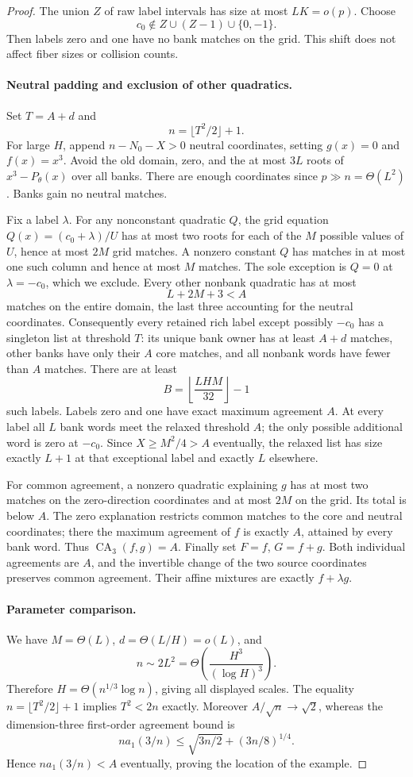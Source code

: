 \begin{proof}
The union $Z$ of raw label intervals has size at most $LK=o(p)$.
Choose
\[
 c_0\notin Z\cup(Z-1)\cup\{0,-1\}.
\]
Then labels zero and one have no bank matches on the grid.  This
shift does not affect fiber sizes or collision counts.

\paragraph{Neutral padding and exclusion of other quadratics.}
Set $T=A+d$ and
\[
 n=\lfloor T^2/2\rfloor+1.
\]
For large $H$, append $n-N_0-X>0$ neutral coordinates, setting
$g(x)=0$ and $f(x)=x^3$.  Avoid the old domain, zero, and the at most
$3L$ roots of $x^3-P_\theta(x)$ over all banks.  There are enough
coordinates since $p\gg n=\Theta(L^2)$.  Banks gain no neutral matches.

Fix a label $\lambda$.  For any nonconstant quadratic $Q$, the grid
equation $Q(x)=(c_0+\lambda)/U$ has at most two roots for each of the
$M$ possible values of $U$, hence at most $2M$ grid matches.
A nonzero constant $Q$ has matches in at most one such column and
hence at most $M$ matches.  The sole exception is $Q=0$ at
$\lambda=-c_0$, which we exclude.  Every other nonbank quadratic has
at most
\[
 L+2M+3<A
\]
matches on the entire domain, the last three accounting for the neutral
coordinates.  Consequently every retained rich label except possibly
$-c_0$ has a singleton list at threshold $T$: its unique bank owner
has at least $A+d$ matches, other banks have only their $A$ core
matches, and all nonbank words have fewer than $A$ matches.
There are at least
\[
 B=\left\lfloor\frac{LHM}{32}\right\rfloor-1
\]
such labels.  Labels zero and one have exact maximum agreement $A$.
At every label all $L$ bank words meet the relaxed threshold $A$;
the only possible additional word is zero at $-c_0$.  Since
$X\ge M^2/4>A$ eventually, the relaxed list has size exactly $L+1$
at that exceptional label and exactly $L$ elsewhere.

For common agreement, a nonzero quadratic explaining $g$ has at
most two matches on the zero-direction coordinates and at most
$2M$ on the grid.  Its total is below $A$.  The zero explanation
restricts common matches to the core and neutral coordinates; there
the maximum agreement of $f$ is exactly $A$, attained by every bank
word.  Thus $\operatorname{CA}_3(f,g)=A$.
Finally set $F=f$, $G=f+g$.  Both individual agreements are $A$,
and the invertible change of the two source coordinates preserves
common agreement.  Their affine mixtures are exactly $f+\lambda g$.

\paragraph{Parameter comparison.}
We have $M=\Theta(L)$, $d=\Theta(L/H)=o(L)$, and
\[
 n\sim2L^2=\Theta\!\left(\frac{H^3}{(\log H)^3}\right).
\]
Therefore $H=\Theta(n^{1/3}\log n)$, giving all displayed scales.
The equality $n=\lfloor T^2/2\rfloor+1$ implies $T^2<2n$ exactly.
Moreover $A/\sqrt n\to\sqrt2$, whereas the dimension-three
first-order agreement bound is
\[
 n a_1(3/n)\le\sqrt{3n/2}+(3n/8)^{1/4}.
\]
Hence $n a_1(3/n)<A$ eventually, proving the location of the example.
\end{proof}

